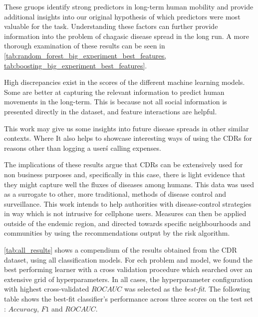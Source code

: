 These gruops identify strong predictors in long-term human mobility and provide additional insights into our original hypothesis of which predictors were most valuable for the task.
Understanding these factors can further provide information into the problem of chagasic disease spread in the long run.
A more thorough examination of these results can be seen in \cref{tab:random_forest_big_experiment_best_features, tab:boosting_big_experiment_best_features}.


High discrepancies exist in the scores of the different machine learning models.
Some are better at capturing the relevant information to predict human movements in the long-term.
This is because not all social information is presented directly in the dataset, and feature interactions are helpful.


This work may give us some insights into future disease spreads in other similar contexts.
Where
It also helps to showcase interesting ways of using the CDRs for reasons other than logging a user\'s calling expenses.



The implications of these results argue that CDRs can be extensively used for non business purposes and, specifically in this case, there is light evidence that they might capture well the fluxes of diseases among humans.
This data was used as a surrogate to other, more traditional, methods of disease control and surveillance.
This work intends to help authorities with disease-control strategies in way which is not intrusive for cellphone users.
Measures can then be applied outside of the endemic region, and directed towards specific neighbourhoods and communities by using the recommendations output by the risk algorithm.


\cref{tab:all_results} shows a compendium of the results obtained from the CDR dataset, using all classification models.
For ech problem and model, we found the best performing learner with a cross validation procedure which searched over an extensive grid of hyperparameters.
In all cases, the hyperparameter configuration with highest cross-validated $ROC AUC$ was selected as the \textit{best-fit}.
The following table shows the best-fit classifier's performance across three scores on the test set : $Accuracy$, $F1$ and $ROC AUC$.

